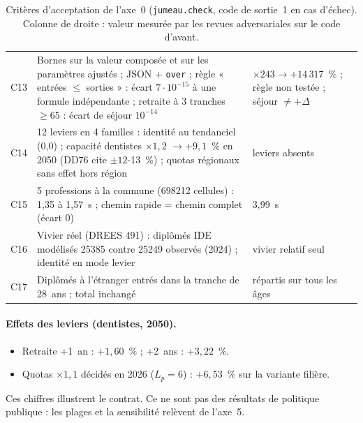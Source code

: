 \documentclass[11pt]{article}
\begin{document}
\begin{table}[h]
\begin{tabular}{lp{6.3cm}p{5.0cm}}
C13 & Bornes sur la valeur composée et sur les paramètres ajustés ; JSON + \texttt{over} ;
règle « entrées $\le$ sorties » : écart $7\cdot10^{-15}$\mesure{} à une formule indépendante ;
retraite à 3 tranches $\ge 65$ : écart de séjour $10^{-14}$\mesure{} & $\times243 \to +14\,317$~\% ;
règle non testée ; séjour $\ne +\Delta$ \\
C14 & 12 leviers en 4 familles : identité au tendanciel (0,0) ; capacité dentistes $\times1{,}2$
$\to +9{,}1$\mesure{}~\% en 2050 (DD76 cite $\pm12$-13~\%) ; quotas régionaux sans effet hors
région & leviers absents \\
C15 & 5 professions à la commune (\num{698212} cellules) : 1,35 à 1,57\mesure{}~s ; chemin rapide
= chemin complet (écart 0) & 3,99\mesure{}~s \\
C16 & Vivier réel (DREES 491) : diplômés IDE modélisés \num{25385} contre \num{25249} observés
(2024) ; identité en mode levier & vivier relatif seul \\
C17 & Diplômés à l'étranger entrés dans la tranche de 28~ans ; total inchangé & répartis sur tous
les âges \\
\bottomrule
\end{tabular}
\caption{Critères d'acceptation de l'axe~0 (\texttt{jumeau.check}, code de sortie~1 en cas
d'échec). Colonne de droite : valeur mesurée par les revues adversariales sur le code d'avant.}
\label{tab:criteres}
\end{table}

\paragraph{Effets des leviers (dentistes, 2050).}
\begin{itemize}
  \item Retraite +1~an : $+1{,}60$\mesure{}~\% ; +2~ans : $+3{,}22$\mesure{}~\%.
  \item Quotas $\times1{,}1$ décidés en 2026 ($L_p = 6$\suppose{}) : $+6{,}53$\mesure{}~\% sur la
        variante filière.
\end{itemize}
Ces chiffres illustrent le contrat. Ce ne sont pas des résultats de politique publique : les plages
et la sensibilité relèvent de l'axe~5.
\end{document}
